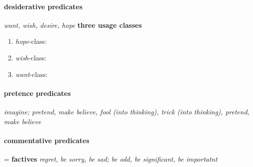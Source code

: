 \documentclass[a4,12pt]{scrartcl}
\begin{document}
\paragraph {\bf desiderative predicates} \cite[3.2.7]{noonan2007} {\it want, wish, desire, hope}
{\bf three usage classes}
	\begin{enumerate}
		\item {\it hope}-class: %
		\item {\it wish}-class: %
		\item {\it want}-class: %
	\end{enumerate}


\paragraph {\bf pretence predicates} \cite[3.2.3]{noonan2007} %
{\it imagine; pretend, make believe, fool (into thinking), trick (into thinking), pretend, make believe}

\paragraph {\bf commentative predicates} = {\bf factives} {\it regret, be sorry, be sad; be odd, be significant, be importatnt} \cite[3.2.4]{noonan2007}
\end{document}

